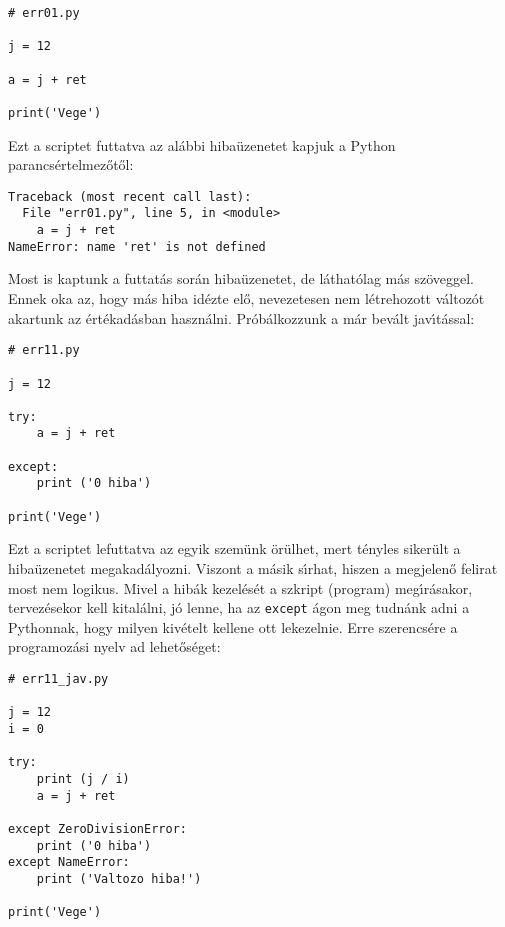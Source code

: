 \documentclass[12pt]{article}
\begin{document}
\begin{Verbatim}[fontsize=\small]
# err01.py

j = 12 

a = j + ret

print('Vege')
\end{Verbatim}

Ezt a scriptet futtatva az al\'abbi hiba\"uzenetet kapjuk a Python parancs\'ertelme\-z\H{o}\-t\H{o}l:

\begin{Verbatim}[fontsize=\small]
Traceback (most recent call last):
  File "err01.py", line 5, in <module>
    a = j + ret
NameError: name 'ret' is not defined

\end{Verbatim}

Most is kaptunk a futtat\'as sor\'an hiba\"uzenetet, de l\'athat\'olag m\'as sz\"oveggel. Ennek oka az, hogy m\'as 
hiba id\'ezte el\H{o}, nevezetesen nem l\'etrehozott v\'altoz\'ot akartunk az \'ert\'ekad\'asban haszn\'alni. 
Pr\'ob\'alkozzunk a m\'ar bev\'alt jav\'{\i}t\'assal:

\begin{Verbatim}[fontsize=\small]
# err11.py

j = 12 

try:
    a = j + ret
    
except:
    print ('0 hiba')
    
print('Vege')
\end{Verbatim}

Ezt a scriptet lefuttatva az egyik szem\"unk \"or\"ulhet, mert t\'enyles siker\"ult a hiba\"u\-ze\-ne\-tet 
megakad\'alyozni. Viszont a m\'asik s\'{\i}rhat, hiszen a megjelen\H{o} felirat most nem logikus. Mivel a hib\'ak 
kezel\'es\'et a szkript (program) meg\'{\i}r\'asakor, tervez\'esekor kell kital\'alni, j\'o lenne, ha az 
{\tt except} \'agon meg tudn\'ank adni a Pythonnak, hogy milyen kiv\'etelt kellene ott lekezelnie. Erre szerencs\'ere 
a programoz\'asi nyelv ad lehet\H{o}s\'eget:

\begin{Verbatim}[fontsize=\small]
# err11_jav.py

j = 12 
i = 0

try:
    print (j / i)
    a = j + ret
    
except ZeroDivisionError:
    print ('0 hiba')
except NameError:
    print ('Valtozo hiba!')
    
print('Vege')
\end{Verbatim}
\end{document}
